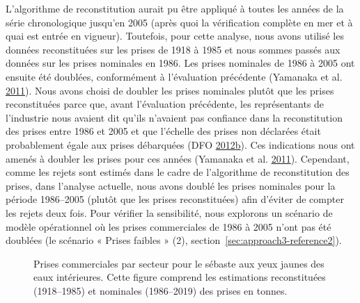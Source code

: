\documentclass[11pt]{book}
\begin{document}
L'algorithme de reconstitution aurait pu être appliqué à toutes les années de la série chronologique jusqu'en 2005 (après quoi la vérification complète en mer et à quai est entrée en vigueur). Toutefois, pour cette analyse, nous avons utilisé les données reconstituées sur les prises de 1918 à 1985 et nous sommes passés aux données sur les prises nominales en 1986. Les prises nominales de 1986 à 2005 ont ensuite été doublées, conformément à l'évaluation précédente (Yamanaka et al. \protect\hyperlink{ref-yamanaka2011}{2011}). Nous avons choisi de doubler les prises nominales plutôt que les prises reconstituées parce que, avant l'évaluation précédente, les représentants de l'industrie nous avaient dit qu'ils n'avaient pas confiance dans la reconstitution des prises entre 1986 et 2005 et que l'échelle des prises non déclarées était probablement égale aux prises débarquées (DFO \protect\hyperlink{ref-dfo2012b}{2012}\protect\hyperlink{ref-dfo2012b}{b}). Ces indications nous ont amenés à doubler les prises pour ces années (Yamanaka et al. \protect\hyperlink{ref-yamanaka2011}{2011}). Cependant, comme les rejets sont estimés dans le cadre de l'algorithme de reconstitution des prises, dans l'analyse actuelle, nous avons doublé les prises nominales pour la période 1986--2005 (plutôt que les prises reconstituées) afin d'éviter de compter les rejets deux fois. Pour vérifier la sensibilité, nous explorons un scénario de modèle opérationnel où les prises commerciales de 1986 à 2005 n'ont pas été doublées (le scénario « Prises faibles » (2), section~\ref{sec:approach3-reference2}).
\begin{figure}[htb]

{\centering {} 

}

\caption{Prises commerciales par secteur pour le sébaste aux yeux jaunes des eaux intérieures. Cette figure comprend les estimations reconstituées (1918--1985) et nominales (1986--2019) des prises en tonnes.}\label{fig:commcatch2}
\end{figure}
\clearpage
\end{document}
